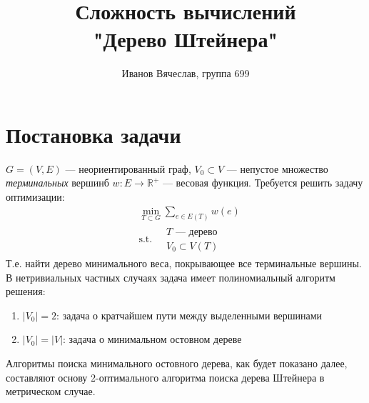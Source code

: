 \documentclass[11pt,a4paper]{report}
\title{Сложность вычислений\\"Дерево Штейнера"}
\author{Иванов Вячеслав, группа 699}
\def\Real{\mathbb{R}}
\theoremstyle{definition}
\theoremstyle{definition}
\theoremstyle{definition}
\begin{document}
	\setlength{\parindent}{1cm}
	{\let\newpage\relax\maketitle}
	\tableofcontents
	\newpage 
	\section{Постановка задачи}
		 $G = (V, E)$ — неориентированный граф, $V_0 \subset V$ — непустое множество \textit{терминальных} вершинб $w : E \to \Real^{+}$ — весовая функция. Требуется решить задачу оптимизации:
		\begin{align*}
			&\min_{T \subset G} \sum_{e \in E(T)} w(e)\\
			&\text{s.t.}\ 
			\begin{aligned}
				&T \text{ — дерево}\\
				&V_0 \subset V(T)			
			\end{aligned}
		\end{align*}
		Т.е. найти дерево минимального веса, покрывающее все терминальные вершины.\\
		В нетривиальных частных случаях задача имеет полиномиальный алгоритм решения:
		\begin{enumerate}
			\item $|V_0| = 2$: задача о кратчайшем пути между выделенными вершинами
			\item $|V_0| = |V|$: задача о минимальном остовном дереве
		\end{enumerate}
		Алгоритмы поиска минимального остовного дерева, как будет показано далее, составляют основу 2-оптимального алгоритма поиска дерева Штейнера в метрическом случае.
\end{document}
